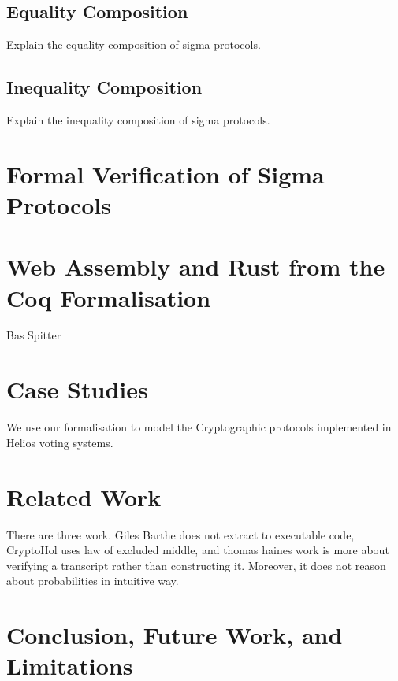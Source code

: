 \documentclass[sigconf]{acmart}
\begin{document}
  \subsection{Equality Composition}
  Explain the equality composition of sigma protocols.

  \subsection{Inequality Composition}
  Explain the inequality composition of sigma protocols.

\section{Formal Verification of Sigma Protocols}


\section{Web Assembly and Rust from the Coq Formalisation}
  Bas Spitter


\section{Case Studies}
  We use our formalisation to model the Cryptographic protocols implemented in 
  Helios voting systems. 


\section{Related Work}
  There are three work. Giles Barthe does not extract to executable code, 
  CryptoHol uses law of excluded middle, and thomas haines work is more about 
  verifying a transcript rather than constructing it. Moreover, 
  it does not reason about probabilities in intuitive way. 

\section{Conclusion, Future Work, and Limitations}









\end{document}
